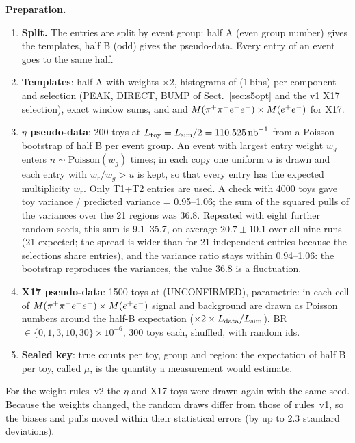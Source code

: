 \textbf{Preparation.}
\begin{enumerate}
\item \textbf{Split.} The entries are split by event group: half A (even group number) gives the
      templates, half B (odd) gives the pseudo-data. Every entry of an event goes to the same half.
\item \textbf{Templates}: half A with weights $\times2$, histograms of \Mfour (1\,\MeVcc bins) per
      component and selection (PEAK, DIRECT, BUMP of Sect.~\ref{sec:s5opt} and the v1 X17 selection),
      exact window sums, and \Mee and $M(\pi^{+}\pi^{-}e^{+}e^{-})\times M(e^{+}e^{-})$ for X17.
\item \textbf{$\eta$ pseudo-data}: 200 toys at $L_{\mathrm{toy}} = L_{\mathrm{sim}}/2 = 110.525\,\mathrm{nb}^{-1}$ from a
      Poisson bootstrap of half B per event group. An event with largest entry weight $w_g$ enters
      $n\sim\mathrm{Poisson}(w_g)$ times; in each copy one uniform $u$ is drawn and each entry with
      $w_r/w_g>u$ is kept, so that every entry has the expected multiplicity $w_r$. Only T1+T2 entries
      are used. A check with 4000 toys gave toy variance / predicted variance = 0.95--1.06; the sum
      of the squared pulls of the variances over the 21 regions was 36.8. Repeated with eight further
      random seeds, this sum is 9.1--35.7, on average $20.7\pm10.1$ over all nine runs (21 expected; the
      spread is wider than for 21 independent entries because the selections share entries), and the
      variance ratio stays within 0.94--1.06: the bootstrap reproduces the variances, the value 36.8 is
      a fluctuation.
\item \textbf{X17 pseudo-data}: 1500 toys at \Ldata (UNCONFIRMED), parametric: in each cell of
      $M(\pi^{+}\pi^{-}e^{+}e^{-})\times M(e^{+}e^{-})$ signal and background are drawn as Poisson numbers around the half-B
      expectation ($\times2\times L_{\mathrm{data}}/L_{\mathrm{sim}}$). BR $\in\{0, 1, 3, 10, 30\}\times10^{-6}$, 300 toys
      each, shuffled, with random ids.
\item \textbf{Sealed key}: true counts per toy, group and region; the expectation of half B per
      toy, called $\mu$, is the quantity a measurement would estimate.
\end{enumerate}
For the weight rules~v2 the $\eta$ and X17 toys were drawn again with the same seed. Because
the weights changed, the random draws differ from those of rules~v1, so the biases and pulls
moved within their statistical errors (by up to 2.3 standard deviations).

